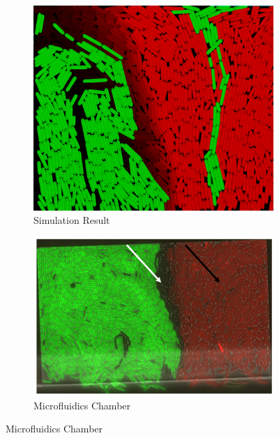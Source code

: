 \documentclass[11pt,a4paper]{article}
\begin{document}
\begin{figure}[H]
    \centering
    \begin{subfigure}[b]{0.45\textwidth}
        \centering
        \includegraphics[width=\textwidth]{../figures/switchLikeSim.png}
        \caption{Simulation Result}
        \label{fig:mono_dec_sim}
    \end{subfigure}
    \hfill
    \begin{subfigure}[b]{0.45\textwidth}
        \centering
        \includegraphics[width=\textwidth]{../figures/switchLikeReal.png}
        \caption{Microfluidics Chamber}
        \label{fig:mono_dec_real}
    \end{subfigure}
    \label{fig:mono_dec_comparison}
\end{figure}
\end{document}
